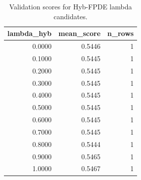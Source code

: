 \begin{table}[t]
\caption{Validation scores for Hyb-FPDE lambda candidates.}
\label{tab:lambda_distribution_computed}
\centering
\begin{tabular}{rrr}
\toprule
lambda\_hyb & mean\_score & n\_rows \\
\midrule
0.0000 & 0.5446 & 1 \\
0.1000 & 0.5445 & 1 \\
0.2000 & 0.5445 & 1 \\
0.3000 & 0.5445 & 1 \\
0.4000 & 0.5445 & 1 \\
0.5000 & 0.5445 & 1 \\
0.6000 & 0.5445 & 1 \\
0.7000 & 0.5445 & 1 \\
0.8000 & 0.5444 & 1 \\
0.9000 & 0.5465 & 1 \\
1.0000 & 0.5467 & 1 \\
\bottomrule
\end{tabular}

\end{table}
